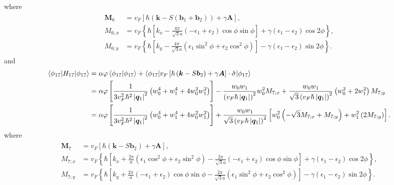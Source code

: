 \documentclass[10pt, oneside]{article}
\newcommand{\vph}{\varphi}
\newcommand{\p}[1]{\left(#1\right)}
\newcommand{\bb}[1]{\left[#1\right]}
\newcommand{\br}[1]{\left\{#1\right\}}
\newcommand{\bv}[1]{\left|#1\right|}
\begin{document}
where
\begin{align}
	\begin{split}
		\bm{M}_{6} & = v_{F} \bb{\hbar \p{\bm{k} - S\p{\bm{b}_{1} + \bm{b}_{2}}} + \gamma \bm{A}}, \\
		M_{6;x} & = v_{F} \br{\hbar \bb{k_{x} - \frac{4 \pi}{\sqrt{3} a} \p{-\epsilon_{1} + \epsilon_{2}} \cos{\phi} \sin{\phi}} + \gamma \p{\epsilon_{1} - \epsilon_{2}} \cos{2 \phi}},\\
		M_{6;y} & = v_{F} \br{\hbar\bb{ k_{y} - \frac{4 \pi}{\sqrt{3} a}\p{\epsilon_{1} \sin^{2}{\phi} + \epsilon_{2} \cos^{2}{\phi}} } - \gamma\p{\epsilon_{1}-\epsilon_{2}}\sin{2\phi}}.
	\end{split}
\end{align}
and
\begin{align}
	\begin{split}
		\braket{\phi_{17} | H_{17} | \phi_{17}} & = \alpha \vph \braket{\phi_{17} | \phi_{17}} + 
		\braket{\phi_{17} | v_{F} \bb{\hbar \p{\bm{k} - S \bm{b}_{2}} + \gamma \bm{A}} \cdot \hat{\sigma} | \phi_{17}} \\
		& = \alpha \vph \bb{\frac{1}{3 v_{F}^{2} \hbar^{2} \bv{\bm{q}_{1}}^{2}} \p{w_{0}^{4} + w_{1}^{4} + 4 w_{0}^{2} w_{1}^{2}}} - \frac{w_0 w_1}{\p{v_{F} \hbar \bv{\bm{q}_1}}^2}  w_0^2 M_{7;x} + \frac{w_0 w_1}{\sqrt{3} \p{v_{F} \hbar \bv{\bm{q}_1}}^2} \p{ w^{2}_{0} + 2 w_{1}^{2}} M_{7;y} \\
		& = \alpha \vph \bb{\frac{1}{3 v_{F}^{2} \hbar^{2} \bv{\bm{q}_{1}}^{2}} \p{w_{0}^{4} + w_{1}^{4} + 4 w_{0}^{2} w_{1}^{2}}} + \frac{w_0 w_1}{\sqrt{3} \p{v_{F} \hbar \bv{\bm{q}_1}}^2} \bb{w_0^2 \p{- \sqrt{3} M_{7;x} + M_{7;y}} + w_1^2 \p{  2 M_{7;y}}}.
	\end{split}
\end{align}
where 
\begin{align}
	\begin{split}
		\bm{M}_{7} & = v_{F} \bb{\hbar \p{\bm{k} - S \bm{b}_{2}} + \gamma \bm{A}}, \\
		M_{7;x} &  = v_{F} \br{\hbar \bb{k_{x} + \frac{2 \pi}{a} \p{\epsilon_{1} \cos^{2}{\phi} + \epsilon_{2} \sin^{2}{\phi}} - \frac{2 \pi}{\sqrt{3} a}\p{ - \epsilon_{1} + \epsilon_{2} } \cos{\phi} \sin{\phi}} + \gamma \p{\epsilon_{1} - \epsilon_{2}} \cos{2 \phi}}, \\
		M_{7;y} & = v_{F} \br{\hbar \bb{k_{y} + \frac{2 \pi}{ a} \p{ - \epsilon_{1} + \epsilon_{2} } \cos{\phi	} \sin{\phi}  - \frac{2 \pi}{\sqrt{3} a}\p{\epsilon_{1} \sin^{2}{\phi} + \epsilon_{2} \cos^{2}{\phi}}} - \gamma \p{\epsilon_{1} - \epsilon_{2}} \sin{2 \phi}}.	
	\end{split}
\end{align}
\end{document}
